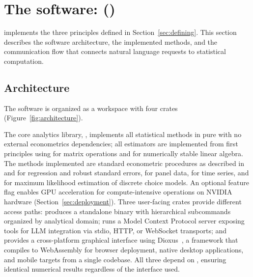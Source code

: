 
\section[The software: prompt2analytics (p2a)]{The software:  ()} \label{sec:tools}

 implements the three principles defined in
Section~\ref{sec:defining}. This section describes the software
architecture, the implemented methods, and the communication flow that
connects natural language requests to statistical computation.

\subsection{Architecture}

The software is organized as a  workspace with four
crates (Figure~\ref{fig:architecture}).

The core analytics library, , implements all
statistical methods in pure  with no external
econometrics dependencies; all estimators are implemented from first
principles using  for matrix operations and 
for numerically stable linear algebra. The methods implemented are standard econometric procedures as
described in \citet{Wooldridge:2010} and
\citet{Cameron+Trivedi:2005} for regression and robust standard
errors, \citet{Baltagi:2013} for panel data,
\citet{Hamilton:1994} for time series, and \citet{Greene:2018} for
maximum likelihood estimation of discrete choice models. An optional
 feature flag enables GPU acceleration for
compute-intensive operations on NVIDIA hardware
(Section~\ref{sec:deployment}). Three user-facing crates provide
different access paths:  produces a standalone
 binary with hierarchical subcommands organized by
analytical domain;  runs a Model Context Protocol server
exposing tools for LLM integration via stdio, HTTP, or WebSocket
transports; and  provides a cross-platform graphical interface
using Dioxus~\citep{Dioxus}, a  framework that
compiles to WebAssembly for browser deployment, native desktop
applications, and mobile targets from a single codebase. All three
depend on , ensuring identical numerical results
regardless of the interface used.

